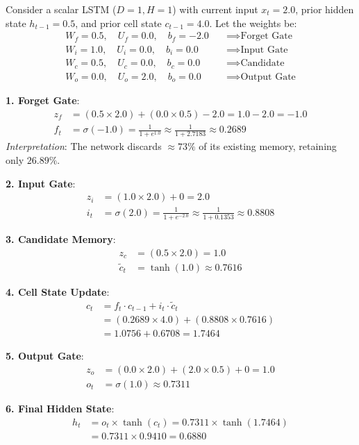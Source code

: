 \begin{example}
Consider a scalar LSTM ($D=1, H=1$) with current input $x_t = 2.0$, prior hidden state $h_{t-1} = 0.5$, and prior cell state $c_{t-1} = 4.0$. Let the weights be:
\begin{align*}
W_f = 0.5, \quad U_f = 0.0, \quad b_f = -2.0 \quad &\implies \text{Forget Gate} \\
W_i = 1.0, \quad U_i = 0.0, \quad b_i = 0.0 \quad &\implies \text{Input Gate} \\
W_c = 0.5, \quad U_c = 0.0, \quad b_c = 0.0 \quad &\implies \text{Candidate} \\
W_o = 0.0, \quad U_o = 2.0, \quad b_o = 0.0 \quad &\implies \text{Output Gate}
\end{align*}

\textbf{1. Forget Gate}:
\begin{align*}
z_f &= (0.5 \times 2.0) + (0.0 \times 0.5) - 2.0 = 1.0 - 2.0 = -1.0 \\
f_t &= \sigma(-1.0) = \frac{1}{1 + e^{1.0}} \approx \frac{1}{1 + 2.7183} \approx \mathbf{0.2689}
\end{align*}
\emph{Interpretation}: The network discards $\approx 73\%$ of its existing memory, retaining only $26.89\%$.

\textbf{2. Input Gate}:
\begin{align*}
z_i &= (1.0 \times 2.0) + 0 = 2.0 \\
i_t &= \sigma(2.0) = \frac{1}{1 + e^{-2.0}} \approx \frac{1}{1 + 0.1353} \approx \mathbf{0.8808}
\end{align*}

\textbf{3. Candidate Memory}:
\begin{align*}
z_c &= (0.5 \times 2.0) = 1.0 \\
\tilde{c}_t &= \tanh(1.0) \approx \mathbf{0.7616}
\end{align*}

\textbf{4. Cell State Update}:
\begin{align*}
c_t &= f_t \cdot c_{t-1} + i_t \cdot \tilde{c}_t \\
    &= (0.2689 \times 4.0) + (0.8808 \times 0.7616) \\
    &= 1.0756 + 0.6708 = \mathbf{1.7464}
\end{align*}

\textbf{5. Output Gate}:
\begin{align*}
z_o &= (0.0 \times 2.0) + (2.0 \times 0.5) + 0 = 1.0 \\
o_t &= \sigma(1.0) \approx \mathbf{0.7311}
\end{align*}

\textbf{6. Final Hidden State}:
\begin{align*}
h_t &= o_t \times \tanh(c_t) = 0.7311 \times \tanh(1.7464) \\
    &= 0.7311 \times 0.9410 = \mathbf{0.6880}
\end{align*}
\end{example}

